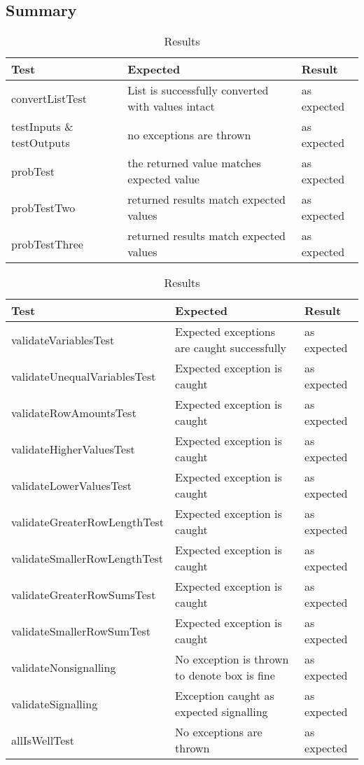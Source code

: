 \documentclass[report.tex]{subfiles}
\begin{document}
\subsection{Summary} %
\label{sub:semantics_summary}
\begin{table}[H]
    \centering
    \begin{tabular}{l | p{6cm} | l}
    Test & Expected & Result \\    
    \hline
    convertListTest & List is successfully converted with values intact
    & as expected \\
    testInputs \& testOutputs & no exceptions are thrown & as expected \\
    probTest & the returned value matches expected value & as expected \\
    probTestTwo & returned results match expected values & as expected \\
    probTestThree & returned results match expected values
    & as expected \\
    \end{tabular}
    \caption{Results}
  \label{tab:box}
\end{table}
\begin{table}[H]
    \centering
    \begin{tabular}{l | p{6cm} | l}
    Test & Expected & Result \\    
    \hline
    validateVariablesTest & Expected exceptions are caught successfully 
    & as expected \\
    validateUnequalVariablesTest & Expected exception is caught 
    & as expected \\
    validateRowAmountsTest & Expected exception is caught & as expected \\
    validateHigherValuesTest & Expected exception is caught & as expected \\
    validateLowerValuesTest & Expected exception is caught & as expected \\
    validateGreaterRowLengthTest & Expected exception is caught & as expected \\
    validateSmallerRowLengthTest & Expected exception is caught & as expected \\
    validateGreaterRowSumsTest & Expected exception is caught & as expected \\
    validateSmallerRowSumTest & Expected exception is caught & as expected \\
    validateNonsignalling & No exception is thrown to denote box is fine & as expected \\
    validateSignalling & Exception caught as expected signalling & as expected \\
    allIsWellTest & No exceptions are thrown & as expected \\
    \end{tabular}
    \caption{Results}
  \label{tab:semantics_summary}
\end{table}
\end{document}
